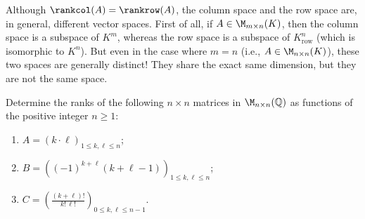 \begin{importantremark}
Although $\rankcol(A) = \rankrow(A)$, the column space and the row space are, in general, different vector spaces. First of all, if $A \in \M_{m \times n}(K)$, then the column space is a subspace of $K^m$, whereas the row space is a subspace of $K_{\text{row}}^n$ (which is isomorphic to $K^n$). But even in the case where $m = n$ (i.e., $A \in \M_{n \times n}(K)$), these two spaces are generally distinct! They share the exact same dimension, but they are not the same space.
\end{importantremark}

\begin{exercise}
\label{exc:ranks_parametric_families_rational_matrices}
Determine the ranks of the following $n \times n$ matrices in $\M_{n \times n}(\mathbb{Q})$ as functions of the positive integer $n \ge 1$:
\begin{enumerate}
    \item $A = (k \cdot \ell)_{1 \le k, \ell \le n}$;
    \item $B = \left( (-1)^{k+\ell} (k + \ell - 1) \right)_{1 \le k, \ell \le n}$;
    \item $C = \left( \frac{(k + \ell)!}{k! \, \ell!} \right)_{0 \le k, \ell \le n-1}$.
\end{enumerate}
\end{exercise}



